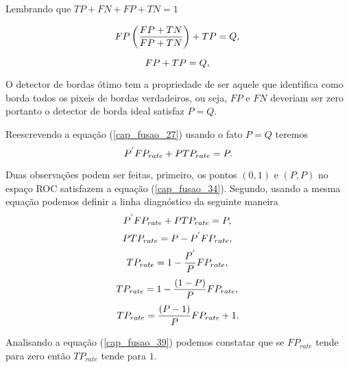  Lembrando que $TP+FN+FP+TN=1$

\begin{equation}\label{cap_fusao_32}
      FP\left(\frac{FP+TN}{FP+TN}\right)+TP = Q, \\
\end{equation}

\begin{equation}\label{cap_fusao_33}
      FP+TP = Q, \\
\end{equation}

O detector de bordas ótimo tem a propriedade de ser aquele que identifica como borda todos os pixeis de bordas verdadeiros, ou seja, $FP$ e $FN$ deveriam ser zero portanto o detector de borda ideal satisfaz $P=Q$. 


Reescrevendo a equação (\ref{cap_fusao_27}) usando o fato $P=Q$ teremos
\begin{equation}\label{cap_fusao_34}
     P^{'}FP_{rate}+P TP_{rate} = P. \\
\end{equation}

Duas observações podem ser feitas, primeiro, os pontos $(0,1)$ e $(P,P)$ no espaço ROC satisfazem a equação (\ref{cap_fusao_34}). Segundo, usando a mesma equação podemos definir a linha diagnóstico da seguinte maneira
\begin{equation}\label{cap_fusao_35}
     P^{'}FP_{rate}+P TP_{rate} = P, \\
\end{equation}
\begin{equation}\label{cap_fusao_36}
     P TP_{rate} = P - P^{'}FP_{rate}, \\
\end{equation}
\begin{equation}\label{cap_fusao_37}
    TP_{rate} = 1 - \frac{P^{'}}{P}FP_{rate}, \\
\end{equation}
\begin{equation}\label{cap_fusao_38}
    TP_{rate} = 1 - \frac{(1-P)}{P}FP_{rate}, \\
\end{equation}
\begin{equation}\label{cap_fusao_39}
    TP_{rate} = \frac{(P-1)}{P}FP_{rate} + 1. \\
\end{equation}

Analisando a equação (\ref{cap_fusao_39}) podemos constatar que se $FP_{rate}$ tende para zero então $TP_{rate}$ tende para $1$. 

